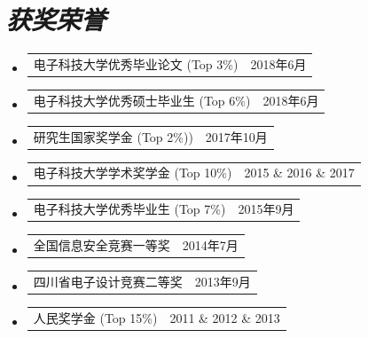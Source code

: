 \documentclass[UTF8]{ctexart}
\makeatletter
\newcommand{\resumeProjectHeading}[2]{
	\item
	\begin{tabular*}{0.97\textwidth}{l@{\extracolsep{\fill}}r}
		 #1 & \small #2 \\
	\end{tabular*}\vspace{-7pt}
}
\newcommand{\resumeSubHeadingListStart}{\begin{itemize}[leftmargin=0.15in, label={}]}
\newcommand{\resumeSubHeadingListEnd}{\end{itemize}}
\makeatother
\begin{document}
	
	\section{\textit{\textbf{获奖荣誉}}}
	\resumeSubHeadingListStart
	\resumeProjectHeading
	{电子科技大学优秀毕业论文 (Top 3\%)}{2018年6月}
	\resumeProjectHeading
	{电子科技大学优秀硕士毕业生 (Top 6\%)}{2018年6月}
	\resumeProjectHeading
	{研究生国家奖学金 (Top 2\%))}{2017年10月}
	\resumeProjectHeading
	{电子科技大学学术奖学金 (Top 10\%)}{2015 \& 2016 \& 2017}
	\resumeProjectHeading
	{电子科技大学优秀毕业生 (Top 7\%)}{2015年9月}
	\resumeProjectHeading
	{全国信息安全竞赛一等奖}{2014年7月}
	\resumeProjectHeading
	{四川省电子设计竞赛二等奖}{2013年9月}
	\resumeProjectHeading
	{人民奖学金 (Top 15\%)}{2011 \& 2012 \& 2013}
	\resumeSubHeadingListEnd
	
	
\end{document}
